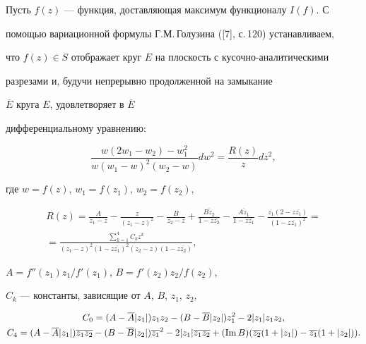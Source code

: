 Пусть $f(z)$ --- функция, доставляющая максимум функционалу $I(f)$. С


помощью вариационной формулы Г.М.\,Голузина ([7], с.\,120) устанавливаем,


что $f(z)\in S$ отображает круг $E$ на плоскость с кусочно-аналитическими


разрезами и, будучи непрерывно продолженной на замыкание


$\overline E$ круга $E$, удовлетворяет в $\overline E$


дифференциальному уравнению:


\begin{equation}


\frac{w(2w_1-w_2)-w_1^2}{w(w_1-w)^2(w_2-w)}dw^2 =\frac{R(z)}{z}dz^2,


\end{equation}


где $w=f(z)$, $w_1=f(z_1)$, $w_2=f(z_2)$,


\begin{multline}


R(z)=\frac {A}{z_1-z}-\frac {z}{(z_1-z)^2}-\frac {B}{z_2-z} +


\frac{\overline {Bz_2}}{1-z \overline {z_2}} -


\frac{\overline {Az_1}}{1-z \overline{z_1}} -


\frac{\overline {z_1}(2-z\overline{z_1})}{(1-z\overline{z_1})^2}=\\


%


=\frac {\sum\limits_{k=1}^4C_kz^k}{(z_1-z)^2(1-z\overline{z_1})^2(z_2-z)


(1-z\overline{z_2})},


\end{multline}


$A=f''(z_1)z_1/f'(z_1)$, $B=f'(z_2)z_2/f(z_2)$,


$C_k$ --- константы, зависящие от $A$, $B$, $z_1$, $z_2$,


\begin{gather*}


C_0=(A-\overline{A}|z_1|)z_1z_2 -


(B-\overline{B}|z_2|)z_1^2-2|z_1|z_1z_2, \\


%


C_4=(A-\overline{A}|z_1|)\overline{z_1z_2} -


(B-\overline{B}|z_2|)\overline{z_1}^2-2|z_1|\overline{z_1z_2} +


(\im B)(\overline{z_2}(1+|z_1|)-\overline{z_1}(1+|z_2|)).


\end{gather*}


